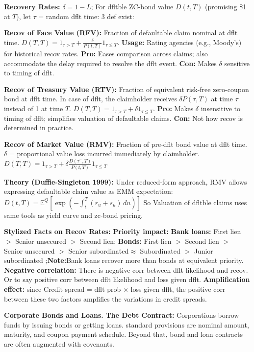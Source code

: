 \documentclass[landscape]{article}
\newcommand{\concept}[1]{\textcolor{conceptcolor}{\textbf{#1}}}
\newcommand{\keyterm}[1]{\textcolor{keycolor}{\textbf{#1}}}
\begin{document}
\begin{multicols}{4}
\textcolor{subsubsectioncolor}{\textbf{Recovery Rates:}} $\delta=1-L$; For dfltble ZC-bond value $D(t,T)$ (promising \$1 at $T$), let $\tau$ = random dflt time: 3 def exist:

\noindent\keyterm{Recov of Face Value (RFV):} 
Fraction of defaultable claim nominal at dflt time.
$D(T,T) = 1_{\tau>T} + \frac{\delta}{P(t,T)} 1_{\tau \leq T}$. \textbf{Usage:} Rating agencies (e.g., Moody's) for historical recov rates.
\textbf{Pro:} Eases comparison across claims; also accommodate the delay required to resolve the dflt event.
\textbf{Con:} Makes $\delta$ sensitive to timing of dflt.

\noindent\keyterm{Recov of Treasury Value (RTV):} 
Fraction of equivalent risk-free zero-coupon bond at dflt time.  In case of dflt, the claimholder receives $\delta P(\tau, T)$ at time $\tau$ instead of 1 at time $T$.
$D(T,T) = 1_{\tau>T} + \delta 1_{\tau \leq T}$. 
\textbf{Pro:} Makes $\delta$ insensitive to timing of dflt; simplifies valuation of defaultable claims.
\textbf{Con:} Not how recov is determined in practice.

\noindent\keyterm{Recov of Market Value (RMV):} 
Fraction of pre-dflt bond value at dflt time. $\delta$ = proportional value loss incurred immediately by claimholder.
$D(T,T) = 1_{\tau>T} + \delta \frac{D(\tau^-, T)}{P(t,T)} 1_{\tau \leq T}$

\textbf{Theory (Duffie-Singleton 1999):} Under reduced-form approach, RMV allows expressing defaultable claim value as EMM expectation: $D(t,T) = \mathbb{E}^Q\left[\exp\left(-\int_t^T (r_u + s_u)\,du\right)\right]$
So Valuation of dfltble claims uses same tools as yield curve and zc-bond pricing.

\noindent\textbf{Stylized Facts on Recov Rates:} \concept{Priority impact:}
\noindent\textbf{Bank loans:} First lien $>$ Senior unsecured $>$ Second lien; \noindent\textbf{Bonds:} First lien $>$ Second lien $>$ Senior unsecured $>$  Senior subordinated$\approx$ Subordinated  $>$ Junior subordinated
;\textbf{Note:}Bank loans recover more than bonds at equivalent priority.
\concept{Negative correlation:} There is negative corr between dflt likelihood and recov. Or to say positive corr between dflt likelihood and loss given dflt. 
\concept{Amplification effect:} since Credit spread = dflt prob $\times$ loss given dflt,  the positive corr between these two factors amplifies 
the variations in credit spreads.


\textcolor{subsectioncolor}{\textbf{Corporate Bonds and Loans.}}
\textcolor{subsubsectioncolor}{\textbf{The Debt Contract:}} Corporations borrow funds by issuing bonds or getting loans. standard provisions are nominal amount, maturity, and coupon payment schedule. Beyond that, bond and loan contracts are often augmented with covenants.


\end{multicols}
\end{document}
